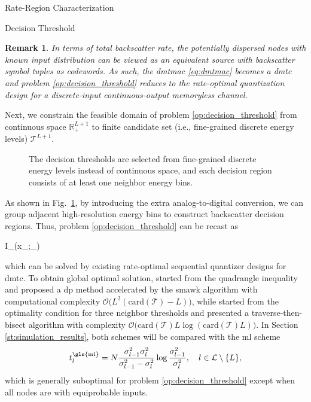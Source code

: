 \documentclass[journal]{IEEEtran}
\newtheorem{remark}{Remark}
\begin{document}
\begin{section}{Rate-Region Characterization}
\begin{subsection}{Decision Threshold}
		\begin{remark}
			In terms of total backscatter rate, the potentially dispersed nodes with known input distribution can be viewed as an equivalent source with backscatter symbol tuples as codewords.
			As such, the \gls{dmtmac} \eqref{eq:dmtmac} becomes a \gls{dmtc} and problem \eqref{op:decision_threshold} reduces to the rate-optimal quantization design for a discrete-input continuous-output memoryless channel.
			\label{re:augmented_source}
		\end{remark}

		Next, we constrain the feasible domain of problem \eqref{op:decision_threshold} from continuous space $\mathbb{R}_+^{L+1}$ to finite candidate set (i.e., fine-grained discrete energy levels) $\mathcal{T}^{L+1}$.
		\begin{figure}[!t]
			\centering
			\resizebox{0.9\columnwidth}{!}{
				
			}
			\caption{The decision thresholds are selected from fine-grained discrete energy levels instead of continuous space, and each decision region consists of at least one neighbor energy bins.}
			\label{fg:discrete_outputs}
		\end{figure}
		As shown in Fig.~\ref{fg:discrete_outputs}, by introducing the extra analog-to-digital conversion, we can group adjacent high-resolution energy bins to construct backscatter decision regions.
		Thus, problem \eqref{op:decision_threshold} can be recast as
		\begin{maxi!}
			{}{I_{}(x_{};_{})}{\label{op:decision_threshold_discrete}}{\label{ob:decision_threshold_discrete}}
			\addConstraint{\eqref{co:sequential_threshold},}
		\end{maxi!}
		which can be solved by existing rate-optimal sequential quantizer designs for \gls{dmtc}.
		To obtain global optimal solution, \cite{He2021} started from the quadrangle inequality and proposed a \gls{dp} method accelerated by the \gls{smawk} algorithm with computational complexity $\mathcal{O}\bigl(L^2(\mathrm{card}(\mathcal{T})-L)\bigr)$, while \cite{Nguyen2020a} started from the optimality condition for three neighbor thresholds and presented a traverse-then-bisect algorithm with complexity $\mathcal{O}\bigl(\mathrm{card}(\mathcal{T})L\log(\mathrm{card}(\mathcal{T})L)\bigr)$.
		In Section \ref{st:simulation_results}, both schemes will be compared with the \gls{ml} scheme \cite{Qian2019}
		\begin{equation}
			t_{l}^{\text{\gls{ml}}} = N \frac{\sigma_{l-1}^2 \sigma_{l}^2}{\sigma_{l-1}^2 - \sigma_{l}^2} \log \frac{\sigma_{l-1}^2}{\sigma_{l}^2}, \quad l \in \mathcal{L} \setminus \{L\},
			\label{eq:detection_threshold_ml}
		\end{equation}
		which is generally suboptimal for problem \eqref{op:decision_threshold} except when all nodes are with equiprobable inputs.
	\end{subsection}
\end{section}
\end{document}
